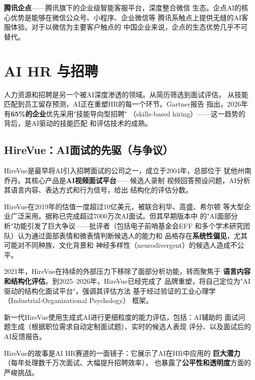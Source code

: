 \textbf{腾讯企点}——腾讯旗下的企业级智能客服平台，深度整合微信
生态。企点AI的核心优势是能够在微信公众号、小程序、企业微信等
腾讯系触点上提供无缝的AI客服体验。对于以微信为主要客户触点的
中国企业来说，企点的生态优势几乎不可替代。


\section{AI HR 与招聘}
\label{sec:social-hr}

人力资源和招聘是另一个被AI深度渗透的领域。从简历筛选到面试评估，
从技能匹配到员工留存预测，AI正在重塑HR的每一个环节。Gartner报告
指出，2026年有\textbf{65\%的企业}优先采用"技能导向型招聘"
（skills-based hiring）——这一趋势的背后，是AI驱动的技能匹配
和评估技术的成熟。

\subsection{HireVue：AI面试的先驱（与争议）}
\label{subsec:hirevue}

HireVue是最早将AI引入招聘面试的公司之一，成立于2004年，总部位于
犹他州南乔丹。其核心产品是\textbf{AI视频面试平台}——候选人录制
视频回答预设问题，AI分析其语言内容、表达方式和行为信号，给出
结构化的评估分数。

HireVue在2019年的估值一度超过10亿美元，被联合利华、高盛、希尔顿
等大型企业广泛采用。据称已完成超过7000万次AI面试。但其早期版本中
的"AI面部分析"功能引发了巨大争议——批评者（包括电子前哨基金会EFF
和多个学术研究团队）认为通过面部表情和微表情判断候选人的能力和
品格存在\textbf{系统性偏见}，尤其可能对不同种族、文化背景和
神经多样性（neurodivergent）的候选人造成不公平。

2021年，HireVue在持续的外部压力下移除了面部分析功能，转而聚焦于
\textbf{语言内容和结构化评估}。到2025--2026年，HireVue已经完成了
品牌重塑，将自己定位为"AI驱动的结构化面试平台"，强调其评估方法
基于经过验证的工业心理学（Industrial-Organizational Psychology）
框架。

新一代HireVue使用生成式AI进行更细粒度的能力评估，包括：AI辅助的
面试问题生成（根据职位需求自动定制面试题）、实时的候选人表现
评分、以及面试后的AI反馈报告。

HireVue的故事是AI HR赛道的一面镜子：它展示了AI在HR中应用的
\textbf{巨大潜力}（每年处理数千万次面试、大幅提升招聘效率），
也暴露了\textbf{公平性和透明度}方面的严峻挑战。

